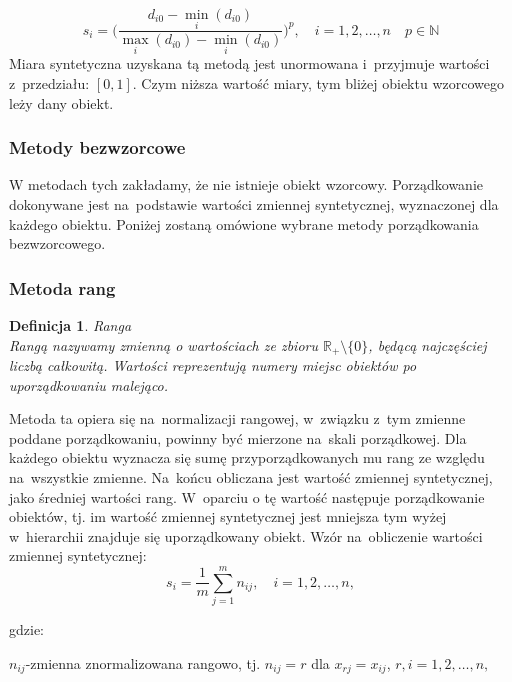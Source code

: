 \documentclass[12pt,a4paper]{report}
\newtheorem{definition}[theorem]{Definicja}
\begin{document}
$$s_{i}=\bigg(\frac{d_{i0}-\min\limits_{i}(d_{i0})}{\max\limits_{i}(d_{i0})-\min\limits_{i}(d_{i0})} \bigg)^{p}, \quad i=1,2,\dots,n \quad p \in \mathbb{N}
$$
Miara syntetyczna uzyskana tą metodą jest unormowana i~przyjmuje wartości z~przedziału: $[0,1]$. Czym niższa wartość miary, tym bliżej obiektu wzorcowego leży dany obiekt. 
\subsubsection{Metody bezwzorcowe}


W metodach tych zakładamy, że nie istnieje obiekt wzorcowy. %
Porządkowanie dokonywane jest na~podstawie wartości zmiennej syntetycznej, wyznaczonej dla każdego obiektu. 
Poniżej zostaną omówione wybrane metody porządkowania bezwzorcowego.

\subsubsection{Metoda rang}

\begin{definition}{Ranga \cite[Rozdział 1.5]{panek2013}}\\
Rangą nazywamy zmienną o wartościach ze zbioru ${\mathbb{R}_{+}\setminus{\{0\}}}$, będącą najczęściej liczbą całkowitą. Wartości reprezentują numery miejsc obiektów po uporządkowaniu malejąco.
\end{definition}
Metoda ta opiera się na~normalizacji rangowej, w~związku z~tym zmienne poddane porządkowaniu, powinny być mierzone na~skali porządkowej. Dla każdego obiektu wyznacza się sumę przyporządkowanych mu rang ze względu na~wszystkie zmienne. Na~końcu obliczana jest wartość zmiennej syntetycznej, jako średniej wartości rang. W~oparciu o tę wartość następuje porządkowanie obiektów, tj. im wartość zmiennej syntetycznej jest mniejsza tym wyżej w~hierarchii znajduje się uporządkowany obiekt. Wzór na~obliczenie wartości zmiennej syntetycznej: 
$$
s_{i}=\frac{1}{m}\sum_{j=1}^{m} n_{ij},\quad i=1, 2, \ldots, n,
$$

gdzie:

$n_{ij}$-zmienna znormalizowana rangowo, tj. $n_{ij}=r$ dla $x_{rj}=x_{ij}$,
$r,i=1, 2, \ldots, n,$
\end{document}
